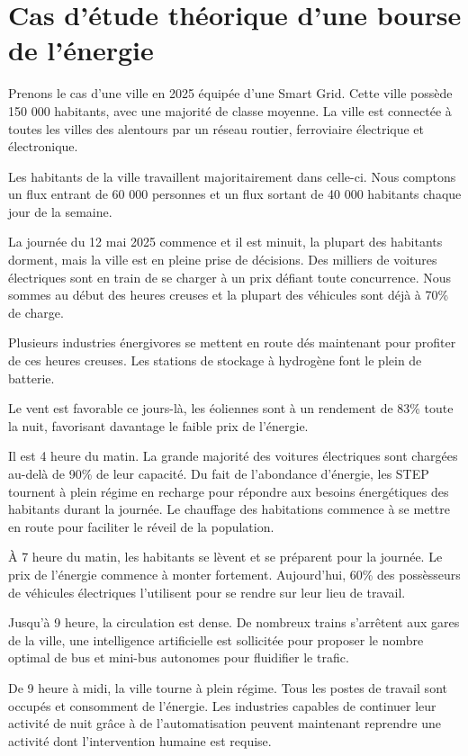 \section{Cas d'étude théorique d'une bourse de l'énergie}

Prenons le cas d'une ville en 2025 équipée d'une Smart Grid.
Cette ville possède 150 000 habitants, avec une majorité de classe moyenne.
La ville est connectée à toutes les villes des alentours par un réseau routier, ferroviaire
électrique et électronique.

Les habitants de la ville travaillent majoritairement dans celle-ci.
Nous comptons un flux entrant de 60 000 personnes et un flux sortant de 40 000 habitants chaque jour
de la semaine.

La journée du 12 mai 2025 commence et il est minuit, la plupart des habitants dorment, mais
la ville est en pleine prise de décisions.
Des milliers de voitures électriques sont en train de se charger à un prix défiant toute concurrence.
Nous sommes au début des heures creuses et la plupart des véhicules sont déjà à 70\% de charge.

Plusieurs industries énergivores se mettent en route dés maintenant pour profiter de ces heures creuses.
Les stations de stockage à hydrogène font le plein de batterie.

Le vent est favorable ce jours-là, les éoliennes sont à un rendement de 83\% toute la nuit,
favorisant davantage le faible prix de l'énergie.

Il est 4 heure du matin. La grande majorité des voitures électriques sont chargées au-delà de 90\% de leur capacité.
Du fait de l'abondance d'énergie, les STEP tournent à plein régime en recharge pour répondre aux besoins
énergétiques des habitants durant la journée.
Le chauffage des habitations commence à se mettre en route pour faciliter le réveil de la population.

À 7 heure du matin, les habitants se lèvent et se préparent pour la journée. Le prix de l'énergie commence à monter
fortement. Aujourd'hui, 60\% des possèsseurs de véhicules électriques l'utilisent pour se rendre sur leur lieu de travail.

Jusqu'à 9 heure, la circulation est dense. De nombreux trains s'arrêtent aux gares de la ville,
une intelligence artificielle est sollicitée pour proposer le nombre optimal
de bus et mini-bus autonomes pour fluidifier le trafic.

De 9 heure à midi, la ville tourne à plein régime. Tous les postes de travail sont occupés et consomment de l'énergie.
Les industries capables de continuer leur activité de nuit grâce à de l'automatisation peuvent maintenant
reprendre une activité dont l'intervention humaine est requise.

